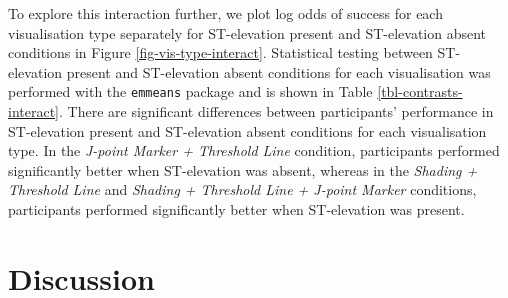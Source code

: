 \documentclass[
  10pt,
  letterpaper,
]{article}
\begin{document}
\begin{table}

\caption{\label{tbl-contrasts-interact}Contrasts between ST-elevation
present and ST-elevation absent conditions for each visualisation type.
The \(p\)-values are adjusted using the Tukey method for multiple
comparisons.}


\end{table}%

To explore this interaction further, we plot log odds of success for
each visualisation type separately for ST-elevation present and
ST-elevation absent conditions in Figure \ref{fig-vis-type-interact}.
Statistical testing between ST-elevation present and ST-elevation absent
conditions for each visualisation was performed with the
\texttt{emmeans} package and is shown in Table
\ref{tbl-contrasts-interact}. There are significant differences between
participants' performance in ST-elevation present and ST-elevation
absent conditions for each visualisation type. In the
\emph{J-point Marker + Threshold Line} condition, participants performed
significantly better when ST-elevation was absent, whereas in the
\emph{Shading + Threshold Line} and
\emph{Shading + Threshold Line + J-point Marker} conditions,
participants performed significantly better when ST-elevation was
present.

\section{Discussion}\label{discussion}
\end{document}
